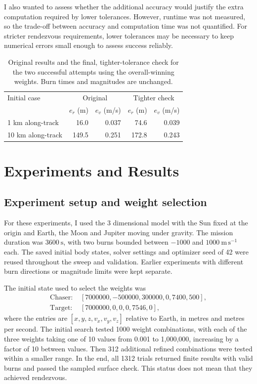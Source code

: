 \documentclass[11pt,letterpaper]{article}
\begin{document}
I also wanted to assess whether the additional accuracy would justify
the extra computation required by lower tolerances. However, runtime
was not measured, so the trade-off between accuracy and computation
time was not quantified. For stricter rendezvous requirements, lower
tolerances may be necessary to keep numerical errors small enough
to assess success reliably.

\begin{table}[htbp]
\centering
\caption{Original results and the final, tighter-tolerance check for the two
successful attempts using the overall-winning weights. Burn times and
magnitudes are unchanged.}
\label{tab:tolerance_checks}
\begin{tabular}{lrrrr}
\toprule
Initial case & \multicolumn{2}{c}{Original} & \multicolumn{2}{c}{Tighter check}\\
 & $e_r$ (m) & $e_v$ (m/s) & $e_r$ (m) & $e_v$ (m/s)\\
\midrule
1 km along-track & 16.0 & 0.037 & 74.6 & 0.039\\
10 km along-track & 149.5 & 0.251 & 172.8 & 0.243\\
\bottomrule
\end{tabular}
\end{table}

\section{Experiments and Results}
\subsection{Experiment setup and weight selection}
For these experiments, I used the 3 dimensional model with the Sun fixed
at the origin and Earth, the Moon and Jupiter moving under gravity.
The mission duration was $3600\ \mathrm{s}$, with two burns bounded
between $-1000$ and $1000\ \mathrm{m\,s^{-1}}$ each. The saved initial
body states, solver settings and optimizer seed of 42 were reused
throughout the sweep and validation. Earlier experiments with different
burn directions or magnitude limits were kept separate.

The initial state used to select the weights was
\begin{align*}
\text{Chaser: } &[7000000,-500000,300000,0,7400,500],\\
\text{Target: } &[7000000,0,0,0,7546,0],
\end{align*}
where the entries are $[x,y,z,v_x,v_y,v_z]$ relative to Earth, in metres
and metres per second. The initial search tested 1000 weight combinations,
with each of the three weights taking one of 10 values from 0.001 to 1,000,000,
increasing by a factor of 10 between values. Then 312 additional refined combinations
were tested within a smaller range. In the end, all 1312 trials returned finite
results with valid burns and passed the sampled surface check. This
status does not mean that they achieved rendezvous.
\end{document}
